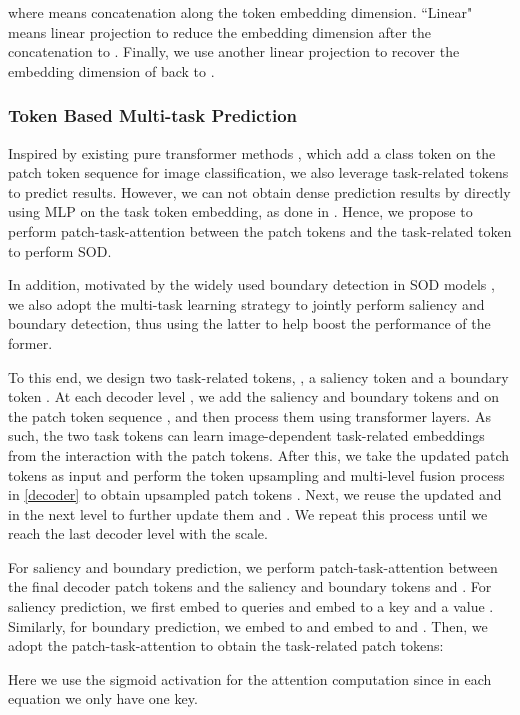 \documentclass[10pt,twocolumn,letterpaper]{article}
\begin{document}
where  means concatenation along the token embedding dimension. ``Linear" means linear projection to reduce the embedding dimension after the concatenation to . Finally, we use another linear projection to recover the embedding dimension of  back to .

\subsubsection{Token Based Multi-task Prediction}
Inspired by existing pure transformer methods \cite{yuan2021tokens,dosovitskiy2020image}, which add a class token on the patch token sequence for image classification, we also leverage task-related tokens to predict results.
However, we can not obtain dense prediction results by directly using MLP on the task token embedding, as done in \cite{yuan2021tokens,dosovitskiy2020image}. Hence, we propose to perform patch-task-attention between the patch tokens and the task-related token to perform SOD.

In addition, motivated by the widely used boundary detection in SOD models \cite{zhao2019EGNet,CVPR2020_LDF,zhang2020select,Wei2020CoNet}, we also adopt the multi-task learning strategy to jointly perform saliency and boundary detection, thus using the latter to help boost the performance of the former.

To this end, we design two task-related tokens, \ie, a saliency token  and a boundary token .
At each decoder level , we add the saliency and boundary tokens  and  on the patch token sequence , and then process them using  transformer layers. As such, the two task tokens can learn image-dependent task-related embeddings from the interaction with the patch tokens. After this, we take the updated patch tokens as input and perform the token upsampling and multi-level fusion process in \eqref{decoder} to obtain upsampled patch tokens . Next, we reuse the updated  and  in the next level  to further update them and . We repeat this process until we reach the last decoder level with the  scale.

For saliency and boundary prediction, we perform patch-task-attention between the final decoder patch tokens  and the saliency and boundary tokens  and .
For saliency prediction, we first embed  to queries  and embed  to a key  and a value .
Similarly, for boundary prediction, we embed  to  and embed  to  and .
Then, we adopt the patch-task-attention to obtain the task-related patch tokens:

Here we use the sigmoid activation for the attention computation since in each equation we only have one key.
\end{document}
